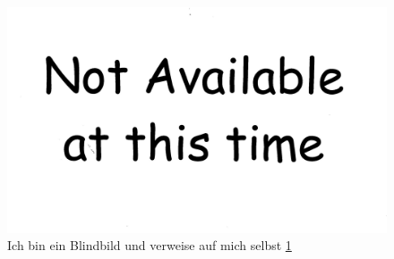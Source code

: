\begin{figure}[H]
	\centering
	\includegraphics[width=1\textwidth]{Bilder/BlindBilder/Notavailable.jpg}
	\caption{Ich bin ein Blindbild und verweise auf mich selbst \ref{Blinblid}}
	\label{Blinblid}
\end{figure}